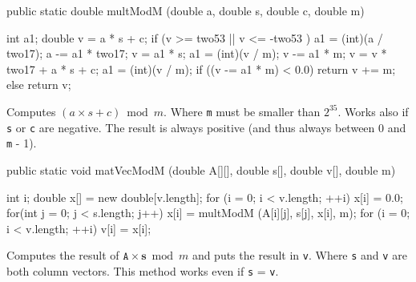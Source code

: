 \begin{code}

   public static double multModM (double a, double s, double c, double m) \begin{hide} {
      int a1;
      double v = a * s + c;
      if (v >= two53 || v <= -two53 ) {
         a1 = (int)(a / two17);
         a -= a1 * two17;
         v  = a1 * s;
         a1 = (int)(v / m);
         v -= a1 * m;
         v  = v * two17 + a * s + c;
      }
      a1 = (int)(v / m);
      if ((v -= a1 * m) < 0.0)
         return v += m;
      else
         return v;
   } \end{hide}
\end{code}
\begin{tabb} Computes $(a \times s + c) \bmod m$. Where \texttt{m} must 
 be smaller than $2^{35}$. Works also if \texttt{s} or \texttt{c} are negative.
 The result is always positive (and thus always between 0 and \texttt{m} - 1).
\end{tabb}
\begin{htmlonly}
\end{htmlonly}
\begin{code}

   public static void matVecModM (double A[][], double s[], double v[],
                                  double m) \begin{hide} {
      int i;
      double x[] = new double[v.length];
      for (i = 0; i < v.length;  ++i) {
         x[i] = 0.0;
         for(int j = 0; j < s.length; j++)
            x[i] = multModM (A[i][j], s[j], x[i], m);
      }
      for (i = 0; i < v.length;  ++i)
         v[i] = x[i];
   } \end{hide}
\end{code}
\begin{tabb} Computes the result of $\mathtt{A} \times \mathtt{\mathbf{s}}
  \bmod m$ and puts the
  result in \texttt{v}. Where \texttt{s} and \texttt{v} are both column vectors. This 
  method works even if \texttt{s} = \texttt{v}.
\end{tabb}
\begin{htmlonly}
\end{htmlonly}
